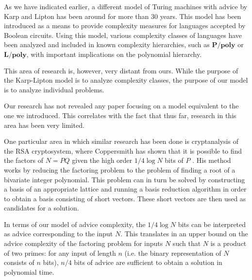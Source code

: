 As we have indicated earlier, a different model of Turing machines with
advice by Karp and Lipton has been around for more than 30 years. This
model has been introduced as a means to provide complexity measures for
languages accepted by Boolean circuits. Using this model, various
complexity classes of languages have been analyzed and included in known
complexity hierarchies, such as $\mathbf{P/poly}$ or $\mathbf{L/poly}$,
with important implications on the polynomial hierarchy.

This area of research is, however, very distant from ours. While the
purpose of the Karp-Lipton model is to analyze complexity classes, the
purpose of our model is to analyze individual problems.

Our research has not revealed any paper focusing on a model equivalent to
the one we introduced. This correlates with the fact that thus far,
research in this area has been very limited.

One particular area in which similar research has been done is
cryptanalysis of the RSA cryptosystem, where Coppersmith has shown that it
is possible to find the factors of $N = PQ$ given the high order $1/4 \log
N$ bits of $P$ \cite{factoring}. His method works by reducing the
factoring problem to the problem of finding a root of a bivariate integer
polynomial. This problem can in turn be solved by constructing a basis of
an appropriate lattice and running a basis reduction algorithm in order to
obtain a basis consisting of short vectors. These short vectors are then
used as candidates for a solution.

In terms of our model of advice complexity, the $1/4 \log N$ bits can be
interpreted as advice corresponding to the input $N$. This translates in
an upper bound on the advice complexity of the factoring problem for
inputs $N$ such that $N$ is a product of two primes: for any input of
length $n$ (i.e. the binary representation of $N$ consists of $n$ bits),
$n/4$ bits of advice are sufficient to obtain a solution in polynomial
time.
